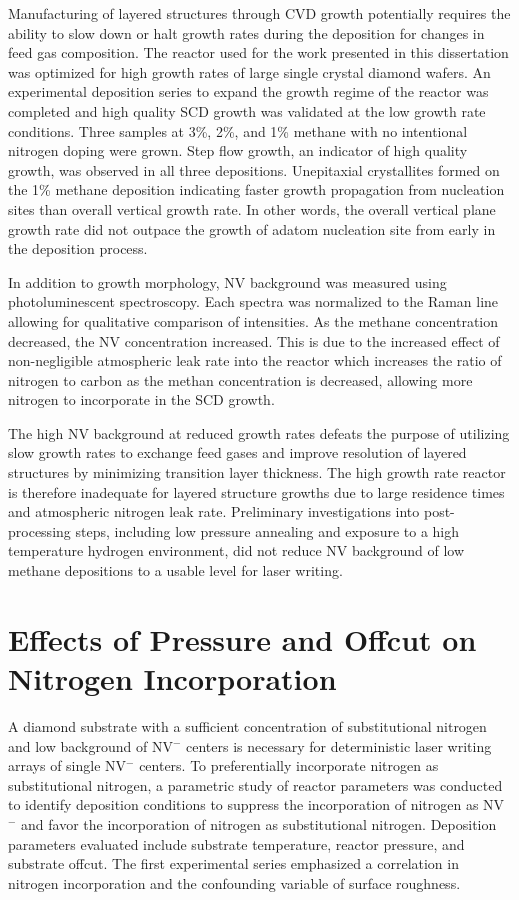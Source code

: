 Manufacturing of layered structures through CVD growth potentially requires the ability to slow down or halt growth rates during the deposition for changes in feed gas composition. The reactor used for the work presented in this dissertation was optimized for high growth rates of large single crystal diamond wafers. An experimental deposition series to expand the growth regime of the reactor was completed and high quality SCD growth was validated at the low growth rate conditions. Three samples at 3\%, 2\%, and 1\% methane with no intentional nitrogen doping were grown. Step flow growth, an indicator of high quality growth, was observed in all three depositions. Unepitaxial crystallites formed on the 1\% methane deposition indicating faster growth propagation from nucleation sites than overall vertical growth rate. In other words, the overall vertical plane growth rate did not outpace the growth of adatom nucleation site from early in the deposition process.

In addition to growth morphology, NV background was measured using photoluminescent spectroscopy. Each spectra was normalized to the Raman line allowing for qualitative comparison of intensities. As the methane concentration decreased, the NV concentration increased. This is due to the increased effect of non-negligible atmospheric leak rate into the reactor which increases the ratio of nitrogen to carbon as the methan concentration is decreased, allowing more nitrogen to incorporate in the SCD growth.

The high NV background at reduced growth rates defeats the purpose of utilizing slow growth rates to exchange feed gases and improve resolution of layered structures by minimizing transition layer thickness. The high growth rate reactor is therefore inadequate for layered structure growths due to large residence times and atmospheric nitrogen leak rate. Preliminary investigations into post-processing steps, including low pressure annealing and exposure to a high temperature hydrogen environment, did not reduce NV background of low methane depositions to a usable level for laser writing. 

\section{Effects of Pressure and Offcut on Nitrogen Incorporation}
\indent

A diamond substrate with a sufficient concentration of substitutional nitrogen and low background of NV$^-$ centers is necessary for deterministic laser writing arrays of single NV$^-$ centers. To preferentially incorporate nitrogen as substitutional nitrogen, a parametric study of reactor parameters was conducted to identify deposition conditions to suppress the incorporation of nitrogen as NV$^-$ and favor the incorporation of nitrogen as substitutional nitrogen. Deposition parameters evaluated include substrate temperature, reactor pressure, and substrate offcut. The first experimental series emphasized a correlation in nitrogen incorporation and the confounding variable of surface roughness.

